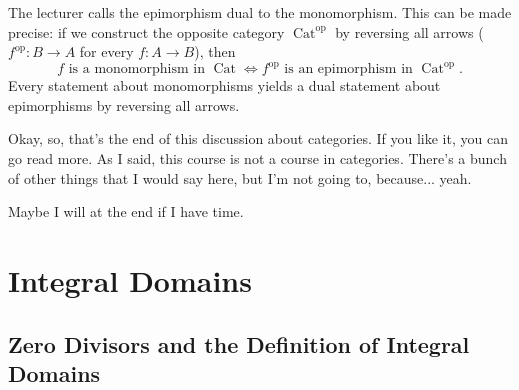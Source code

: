 \begin{aiNote}
The lecturer calls the epimorphism dual to the monomorphism. This can be made precise: if we construct the opposite category $\operatorname{Cat}^{\text{op}}$ by reversing all arrows ($f^{\text{op}} \colon B \to A$ for every $f \colon A \to B$), then
\[
f \text{ is a monomorphism in } \operatorname{Cat} \iff f^{\text{op}} \text{ is an epimorphism in } \operatorname{Cat}^{\text{op}}.
\]
Every statement about monomorphisms yields a dual statement about epimorphisms by reversing all arrows.
\end{aiNote}

\begin{speech}[00:10:37 - 00:11:03]
Okay, so, that's the end of this discussion about categories. If you like it, you can go read more. As I said, this course is not a course in categories. There's a bunch of other things that I would say here, but I'm not going to, because... yeah.

Maybe I will at the end if I have time.
\end{speech}

\begin{hidden}
\end{hidden}

\section{Integral Domains}

\subsection{Zero Divisors and the Definition of Integral Domains}

